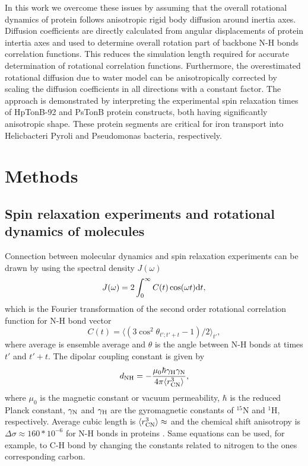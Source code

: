 \documentclass[pre,aps,floatfix,authordate1-4,twocolumn]{revtex4-1}
\begin{document}
In this work we overcome these issues by assuming that the overall
rotational dynamics of protein follows
anisotropic rigid body diffusion around inertia axes. 
Diffusion coefficients are directly calculated from angular displacements of
protein intertia axes and used to determine overall rotation part
of backbone N-H bonds correlation functions.
This reduces the simulation length required for accurate determination
of rotational correlation functions. Furthermore, the overestimated
rotational diffusion due to water model can be anisotropically corrected
by scaling the diffusion coefficients in all directions with a constant
factor. The approach is demonstrated by interpreting the experimental
spin relaxation times of HpTonB-92 \cite{ciragan16} and PsTonB \cite{??}
protein constructs, both having significantly anisotropic shape. 
These protein segments are critical for iron transport into Helicbacteri
Pyroli and Pseudomonas bacteria, respectively.


\section{Methods}

\subsection{Spin relaxation experiments and rotational dynamics of molecules}
Connection between molecular dynamics and spin relaxation experiments can
be drawn by using the spectral density $J(\omega)$ 
\begin{equation}\label{SPECTdens}
  J(\omega)=2\int_0^\infty C(t) \cos(\omega t) {\rm d}t,
\end{equation}
which is the Fourier transformation of the second order
rotational correlation function for N-H bond vector
\begin{equation}\label{CORRFdef}
  C(t)=\langle (3\cos^2\theta_{t';t'+t}-1)/2 \rangle_{t'},
\end{equation}
where average is ensemble average and $\theta$ is the angle between N-H bonds at times $t'$ and $t'+t$.
The dipolar coupling constant is given by
\begin{equation}
d_{\rm{NH}}=-\frac{\mu_0\hbar\gamma_{\rm{H}}\gamma_{\rm{N}}}{4\pi\langle r_{\rm{CN}}^3\rangle},\nonumber
\end{equation}
where $\mu_0$ is the magnetic constant or vacuum permeability, $\hbar$ is the reduced Planck constant,
$\gamma_{\rm{N}}$ and $\gamma_{\rm{H}}$ are the gyromagnetic constants of $^{15}$N and $^1$H, respectively.
Average cubic length is $\langle r_{\rm{CN}}^3\rangle \approx$ and the 
chemical shift anisotropy is $\Delta \sigma \approx 160*10^{-6}$ for N-H bonds in proteins \cite{??}.
Same equations can be used, for example, to C-H bond by changing the
constants related to nitrogen to the ones corresponding carbon. 
\end{document}
